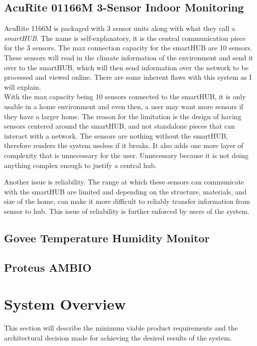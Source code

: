 \documentclass{article}
\begin{document}
\subsection{AcuRite 01166M 3-Sensor Indoor Monitoring}
AcuRite 1166M is packaged with 3 sensor units along with what they call a \textit{smartHUB}. The name is self-explanatory, it is the central communication piece for the 3 sensors. The max connection capacity for the smartHUB are 10 sensors. These sensors will read in the climate information of the environment and send it over to the smartHUB, which will then send information over the network to be processed and viewed online. There are some inherent flaws with this system as I will explain.\\

With the max capacity being 10 sensors connected to the smartHUB, it is only usable in a home environment and even then, a user may want more sensors if they have a larger home. The reason for the limitation is the design of having sensors centered around the smartHUB, and not standalone pieces that can interact with a network. The sensors are nothing without the smartHUB, therefore renders the system useless if it breaks. It also adds one more layer of complexity that is unnecessary for the user. Unnecessary because it is not doing anything complex enough to justify a central hub.

Another issue is reliability. The range at which these sensors can communicate with the smartHUB are limited and depending on the structure, materials, and size of the home, can make it more difficult to reliably transfer information from sensor to hub. This issue of reliability is further enforced by users of the system.

\subsection{Govee Temperature Humidity Monitor}
\subsection{Proteus AMBIO}

\section{System Overview}
This section will describe the minimum viable product requirements and the architectural decision made for achieving the desired results of the system.
\end{document}
